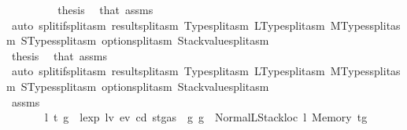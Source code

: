 \begin{isabellebody}
\ \ \ \ \ \ \isamarkupfalse%
\ \isamarkupfalse%
\ {\isacharquery}{\kern0pt}thesis\ \isamarkupfalse%
\ that{\isacharparenleft}{\kern0pt}{}{}{\isacharparenright}{\kern0pt}\ assms\ {}\isanewline
\ \ \ \ \ \ \ \ \isamarkupfalse%
\ {\isacharparenleft}{\kern0pt}auto\ split{\isacharcolon}{\kern0pt}if{\isacharunderscore}{\kern0pt}split{\isacharunderscore}{\kern0pt}asm\ result{\isachardot}{\kern0pt}split{\isacharunderscore}{\kern0pt}asm\ Type{\isachardot}{\kern0pt}split{\isacharunderscore}{\kern0pt}asm\ LType{\isachardot}{\kern0pt}split{\isacharunderscore}{\kern0pt}asm\ MTypes{\isachardot}{\kern0pt}split{\isacharunderscore}{\kern0pt}asm\ STypes{\isachardot}{\kern0pt}split{\isacharunderscore}{\kern0pt}asm\ option{\isachardot}{\kern0pt}split{\isacharunderscore}{\kern0pt}asm\ Stackvalue{\isachardot}{\kern0pt}split{\isacharunderscore}{\kern0pt}asm{\isacharparenright}{\kern0pt}\isanewline
\ \ \ \ \isamarkupfalse%
\isanewline
\ \ \ \ \ \ \isamarkupfalse%
\ {}{}\isanewline
\ \ \ \ \ \ \isamarkupfalse%
\ \isamarkupfalse%
\ {\isacharquery}{\kern0pt}thesis\ \isamarkupfalse%
\ that{\isacharparenleft}{\kern0pt}{}{}{\isacharparenright}{\kern0pt}\ assms\ {}\isanewline
\ \ \ \ \ \ \ \ \isamarkupfalse%
\ {\isacharparenleft}{\kern0pt}auto\ split{\isacharcolon}{\kern0pt}if{\isacharunderscore}{\kern0pt}split{\isacharunderscore}{\kern0pt}asm\ result{\isachardot}{\kern0pt}split{\isacharunderscore}{\kern0pt}asm\ Type{\isachardot}{\kern0pt}split{\isacharunderscore}{\kern0pt}asm\ LType{\isachardot}{\kern0pt}split{\isacharunderscore}{\kern0pt}asm\ MTypes{\isachardot}{\kern0pt}split{\isacharunderscore}{\kern0pt}asm\ STypes{\isachardot}{\kern0pt}split{\isacharunderscore}{\kern0pt}asm\ option{\isachardot}{\kern0pt}split{\isacharunderscore}{\kern0pt}asm\ Stackvalue{\isachardot}{\kern0pt}split{\isacharunderscore}{\kern0pt}asm{\isacharparenright}{\kern0pt}\isanewline
\ \ \ \ \isamarkupfalse%
\isanewline
\ \ \isamarkupfalse%
\isanewline
\ \ \ \ \isamarkupfalse%
\ {}\isanewline
\ \ \ \ \isamarkupfalse%
\ assms\ \isamarkupfalse%
\isanewline
\ \ \ \ \ \ {\isacharparenleft}{\kern0pt}{}{}{\isacharparenright}{\kern0pt}\ l\ t{\isacharprime}{\kern0pt}\ g{\isacharprime}{\kern0pt}\ \ {\isachardoublequoteopen}lexp\ lv\ ev\ cd\ {\isacharparenleft}{\kern0pt}st{\isasymlparr}gas\ {\isacharcolon}{\kern0pt}{\isacharequal}{\kern0pt}\ g{\isasymrparr}{\isacharparenright}{\kern0pt}\ g\ {\isacharequal}{\kern0pt}\ Normal{\isacharparenleft}{\kern0pt}{\isacharparenleft}{\kern0pt}LStackloc\ l{\isacharcomma}{\kern0pt}\ Memory\ t{\isacharprime}{\kern0pt}{\isacharparenright}{\kern0pt}{\isacharcomma}{\kern0pt}g{\isacharprime}{\kern0pt}{\isacharparenright}{\kern0pt}{\isachardoublequoteclose}\isanewline

\end{isabellebody}

